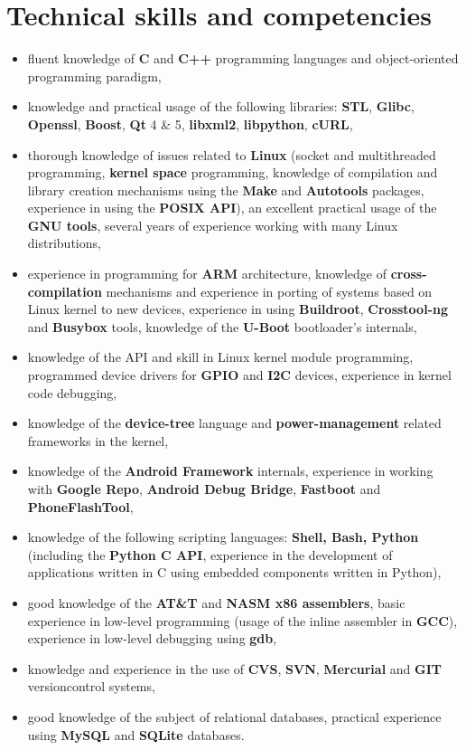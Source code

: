 \documentclass[10pt]{article}
\begin{document}
\section*{Technical skills and competencies}
\begin{itemize}
	\item fluent knowledge of \textbf{C} and \textbf{C++} programming languages and
	object-oriented programming paradigm,
	\item knowledge and practical usage of the following libraries: \textbf{STL},
	\textbf{Glibc}, \textbf{Openssl}, \textbf{Boost}, \textbf{Qt} 4 \& 5, \textbf{libxml2},
	\textbf{libpython}, \textbf{cURL},
	\item thorough knowledge of issues related to \textbf{Linux} (socket and multithreaded
	programming, \textbf{kernel space} programming, knowledge of compilation and library
	creation mechanisms using the \textbf{Make} and \textbf{Autotools} packages, experience in
	using the \textbf{POSIX API}), an excellent practical usage of the \textbf{GNU tools},
	several years of experience working with many Linux distributions,
	\item experience in programming for \textbf{ARM} architecture, knowledge of \textbf{cross-
	compilation} mechanisms and experience in porting of systems based on Linux kernel to new
	devices, experience in using \textbf{Buildroot}, \textbf{Crosstool-ng} and
	\textbf{Busybox} tools, knowledge of the \textbf{U-Boot} bootloader's internals,
	\item knowledge of the API and skill in Linux kernel module programming, programmed
	device drivers for \textbf{GPIO} and \textbf{I2C} devices, experience in kernel code
	debugging,
	\item knowledge of the \textbf{device-tree} language and \textbf{power-management} related
	frameworks in the kernel,
	\item knowledge of the \textbf{Android Framework} internals, experience in working with
	\textbf{Google Repo}, \textbf{Android Debug Bridge}, \textbf{Fastboot} and
	\textbf{PhoneFlashTool},
	\item knowledge of the following scripting languages: \textbf{Shell, Bash, Python}
	(including the \textbf{Python C API}, experience in the development of applications
	written in C using embedded components written in Python),
	\item good knowledge of the \textbf{AT\&T} and \textbf{NASM x86 assemblers}, basic
	experience in low-level programming (usage of the inline assembler in \textbf{GCC}),
	experience in low-level debugging using \textbf{gdb},
	\item knowledge and experience in the use of \textbf{CVS}, \textbf{SVN},
	\textbf{Mercurial} and \textbf{GIT} versioncontrol systems,
	\item good knowledge of the subject of relational databases, practical experience using
	\textbf{MySQL} and \textbf{SQLite} databases.
\end{itemize}
\end{document}
